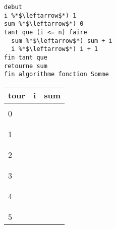 \documentclass[11pt,a4paper]{article}
\begin{document}
\begin{table}[h!]
\begin{minipage}{0.59\textwidth}
\begin{lstlisting}[style=algorithm]
debut
i %*$\leftarrow$*) 1
sum %*$\leftarrow$*) 0
tant que (i <= n) faire
  sum %*$\leftarrow$*) sum + i
  i %*$\leftarrow$*) i + 1
fin tant que
retourne sum
fin algorithme fonction Somme \end{lstlisting}
  \end{minipage}
  \hfillx
  \begin{minipage}{0.4\textwidth}
    \centering
    \begin{tabular}{|C{1cm}|C{1cm}|C{1cm}|}
        \hline
        tour &  i &  sum  \\
        \hline
             &    &       \\
        0    &    &       \\
             &    &       \\
        \hline
             &    &       \\
        1    &    &       \\
             &    &       \\
        \hline
             &    &       \\
        2    &    &       \\
             &    &       \\
        \hline
             &    &       \\
        3    &    &       \\
             &    &       \\
        \hline
             &    &       \\
        4    &    &       \\
             &    &       \\
        \hline
             &    &       \\
        5    &    &       \\

\end{tabular}
\end{minipage}
\end{table}
\end{document}
